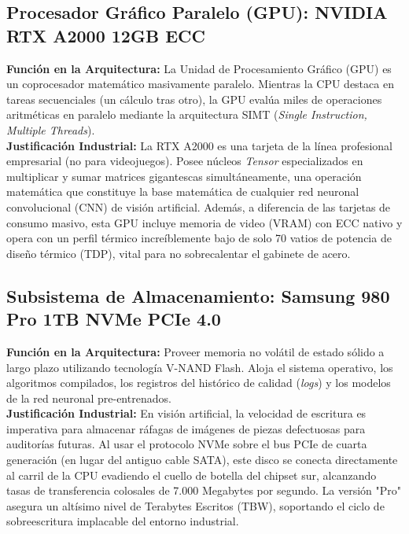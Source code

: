 \documentclass[12pt,letterpaper]{article}
\begin{document}
\subsection{Procesador Gráfico Paralelo (GPU): NVIDIA RTX A2000 12GB ECC}
\textbf{Función en la Arquitectura:} La Unidad de Procesamiento Gráfico (GPU) es un coprocesador matemático masivamente paralelo. Mientras la CPU destaca en tareas secuenciales (un cálculo tras otro), la GPU evalúa miles de operaciones aritméticas en paralelo mediante la arquitectura SIMT (\textit{Single Instruction, Multiple Threads}).
\\
\textbf{Justificación Industrial:} La RTX A2000 es una tarjeta de la línea profesional empresarial (no para videojuegos). Posee núcleos \textit{Tensor} especializados en multiplicar y sumar matrices gigantescas simultáneamente, una operación matemática que constituye la base matemática de cualquier red neuronal convolucional (CNN) de visión artificial. Además, a diferencia de las tarjetas de consumo masivo, esta GPU incluye memoria de video (VRAM) con ECC nativo y opera con un perfil térmico increíblemente bajo de solo 70 vatios de potencia de diseño térmico (TDP), vital para no sobrecalentar el gabinete de acero.

\subsection{Subsistema de Almacenamiento: Samsung 980 Pro 1TB NVMe PCIe 4.0}
\textbf{Función en la Arquitectura:} Proveer memoria no volátil de estado sólido a largo plazo utilizando tecnología V-NAND Flash. Aloja el sistema operativo, los algoritmos compilados, los registros del histórico de calidad (\textit{logs}) y los modelos de la red neuronal pre-entrenados.
\\
\textbf{Justificación Industrial:} En visión artificial, la velocidad de escritura es imperativa para almacenar ráfagas de imágenes de piezas defectuosas para auditorías futuras. Al usar el protocolo NVMe sobre el bus PCIe de cuarta generación (en lugar del antiguo cable SATA), este disco se conecta directamente al carril de la CPU evadiendo el cuello de botella del chipset sur, alcanzando tasas de transferencia colosales de 7.000 Megabytes por segundo. La versión "Pro" asegura un altísimo nivel de Terabytes Escritos (TBW), soportando el ciclo de sobreescritura implacable del entorno industrial.
\end{document}
